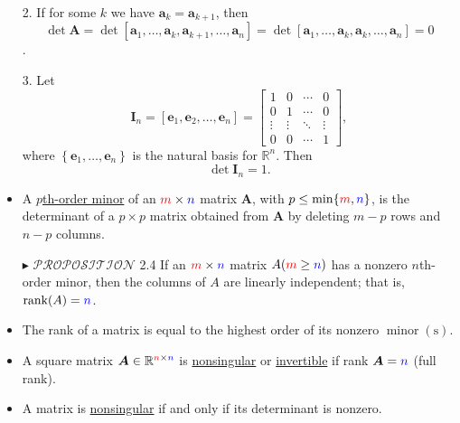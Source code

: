 \documentclass[12pt,thmsa]{article}
\begin{document}
\begin{itemize}
	2. If for some \(k\) we have \(\boldsymbol{a}_{k}=\boldsymbol{a}_{k+1}\), then
	\[\operatorname{det} \boldsymbol{A}=\operatorname{det}\left[\boldsymbol{a}_{1}, \ldots, \boldsymbol{a}_{k}, \boldsymbol{a}_{k+1}, \ldots, \boldsymbol{a}_{n}\right]=\operatorname{det}\left[\boldsymbol{a}_{1}, \ldots, \boldsymbol{a}_{k}, \boldsymbol{a}_{k}, \ldots, \boldsymbol{a}_{n}\right]=0\].
	
	3. Let
	\[
	\boldsymbol{I}_{n}=\left[\boldsymbol{e}_{1}, \boldsymbol{e}_{2}, \ldots, \boldsymbol{e}_{n}\right]=\left[\begin{array}{cccc}
		1 & 0 & \cdots & 0 \\
		0 & 1 & \cdots & 0 \\
		\vdots & \vdots & \ddots & \vdots \\
		0 & 0 & \cdots & 1
	\end{array}\right],
	\]
	where \( \left\{\boldsymbol{e}_{1}, \ldots, \boldsymbol{e}_{n}\right\} \) is the natural basis for \(\mathbb{R}^{n}\). Then
	\[
	\operatorname{det} \boldsymbol{I}_{n}=1.
	\]
	
	\item A \underline{\(p\)th-order minor} of an \({\color{red}{m}} \times {\color{blue}{n}}\) matrix \(\boldsymbol{A}\), with \(p \leq \min \{{\color{red}{m}}, {\color{blue}{n}}\}\), is the determinant of a \(p \times p\) matrix obtained from \(\boldsymbol{A}\) by deleting \(m-p\) rows and \(n-p\) columns.
	
	\item[\(\blacktriangleright\)] \(\mathscr{PROPOSITION}\) 2.4 If an \({\color{red}{m}} \times {\color{blue}{n}}\) matrix \(A({\color{red}{m}} \geq {\color{blue}{n}})\) has a nonzero \(n\)th-order minor, then the columns of \(A\) are linearly independent; that is, \(\operatorname{rank}(A)={\color{blue}{n}}\).
	
	\item The rank of a matrix is equal to the highest order of its nonzero \(\operatorname{minor}(\mathrm{s})\).
	
	\item A square matrix \(\boldsymbol{A} \in \mathbb{R}^{{\color{red}{n}} \times {\color{blue}{n}}}\) is \underline{nonsingular} or \underline{invertible} if rank \(\boldsymbol{A}={\color{blue}{n}}\) (full rank).
	
	\item A matrix is \underline{nonsingular} if and only if its determinant is nonzero.
	
\end{itemize}
\end{document}
